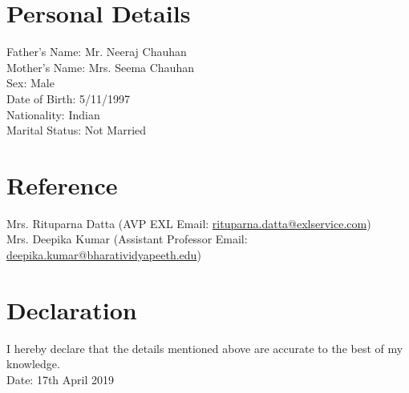 \documentclass{article}
\begin{document}
\section{Personal Details}
Father's Name: Mr. Neeraj Chauhan
\\ Mother's Name: Mrs. Seema Chauhan
\\ Sex: Male
\\ Date of Birth: 5/11/1997
\\ Nationality: Indian
\\ Marital Status: Not Married

\section{Reference}
Mrs. Rituparna Datta (AVP EXL Email: \href{mailto:rituparna.datta@exlservice.com}{rituparna.datta@exlservice.com})
\\Mrs. Deepika Kumar (Assistant Professor Email: \href{mailto:deepika.kumar@bharatividyapeeth.edu}{deepika.kumar@bharatividyapeeth.edu})

\section{Declaration}
I hereby declare that the details mentioned above are accurate to the best of my knowledge.
\\Date: 17th April 2019
\end{document}

